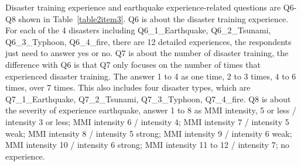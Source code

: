 \cleardoublepage
Disaster training experience and earthquake experience-related questions are Q6-Q8 shown in Table~\ref{table2item3}. Q6 is about the disaster training experience. For each of the 4 disasters including Q6\_1\_Earthquake, Q6\_2\_Tsunami, Q6\_3\_Typhoon, Q6\_4\_fire, there are 12 detailed experiences, the respondents just need to answer yes or no. Q7 is about the number of disaster training, the difference with Q6 is that Q7 only focuses on the number of times that experienced disaster training. The answer 1 to 4 as one time, 2 to 3 times, 4 to 6 times, over 7 times. This also includes four disaster types, which are Q7\_1\_Earthquake, Q7\_2\_Tsunami, Q7\_3\_Typhoon, Q7\_4\_fire. Q8 is about the severity of experience earthquake, answer 1 to 8 as MMI intensity, 5 or less / intensity 3 or less; MMI intensity 6 / intensity 4; MMI intensity 7 / intensity 5 weak; MMI intensity 8 / intensity 5 strong; MMI intensity 9 / intensity 6 weak; MMI intensity 10 / intensity 6 strong; MMI intensity 11 to 12 / intensity 7; no experience. 



